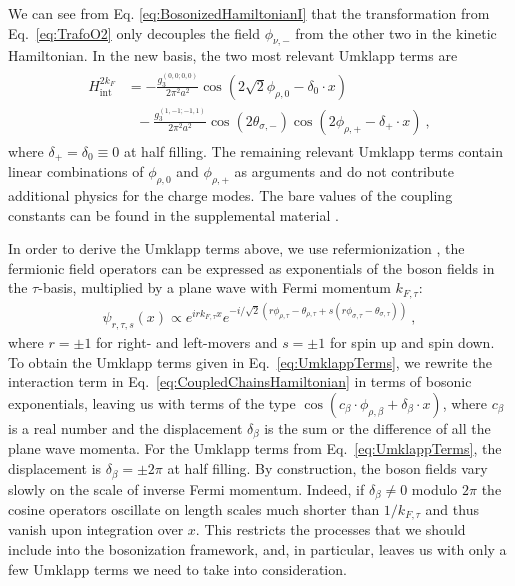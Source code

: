 \documentclass[twocolumn, prl, aps, floatfix, superscriptaddress, longbibliography]{revtex4-1}
\begin{document}
%
We can see from Eq. \eqref{eq:BosonizedHamiltonianI} that the transformation from Eq.~{\eqref{eq:TrafoO2}} only decouples the field $\phi_{\nu,-}$ from the other two in the kinetic Hamiltonian. In the new basis, the two  most relevant Umklapp terms are
%
\begin{align} \label{eq:UmklappTerms}
	\begin{split}
		H^{2k_F}_{\text{int}} &=  -\frac{g_3^{(0,0;0,0)}}{2\pi^2a^2} \cos(2\sqrt{2}\phi_{\rho,0} - \delta_0\cdot  x)   \\ 
		&\ \ \ -  \frac{g_3^{(1,-1;-1,1)}}{2\pi^2a^2}  \cos(2\theta_{\sigma,-}) \cos(2 \phi_{\rho,+} -\delta_+\cdot x) \ ,
	\end{split}
\end{align}
%
where $\delta_+ = \delta_0 \equiv 0$ at half filling. The remaining relevant Umklapp terms contain linear combinations of $\phi_{\rho,0}$ and $\phi_{\rho,+}$ as arguments and do not contribute additional physics for the charge modes. The bare values of the coupling constants can be found in the supplemental material \cite{supp}. 

In order to derive the Umklapp terms above, we use refermionization \cite{GiamarchiBook, vonDelft1998}, the fermionic field operators can be expressed  as exponentials of the boson fields in the $\tau$-basis, multiplied by a  plane wave with Fermi momentum $k_{F,\tau}$:
%
\begin{align}\label{eq:FieldOperator}
	\psi_{r,\tau,s}(x) \propto e^{irk_{F,\tau}x}e^{-i/\sqrt{2}(r\phi_{\rho,\tau} - \theta_{\rho,\tau}+s(r\phi_{\sigma,\tau}-\theta_{\sigma,\tau}))} \ ,
\end{align}
%
where $r=\pm1$ for right- and left-movers and $s = \pm1$ for spin up and spin down. To obtain the  Umklapp terms given in Eq.~\eqref{eq:UmklappTerms}, we rewrite the interaction term in Eq.~\eqref{eq:CoupledChainsHamiltonian} in terms of  bosonic exponentials, leaving us with terms of the type $\cos(c_{\beta}\cdot \phi_{\rho,\beta} + \delta_{\beta} \cdot x)$, where $c_{\beta}$ is a real number and the displacement $\delta_{\beta}$ is the sum or the difference of all the plane wave momenta. For the Umklapp terms from Eq.~\eqref{eq:UmklappTerms}, the displacement is $\delta_{\beta} = \pm 2\pi$ at half filling. By construction, the boson fields vary slowly on the scale of inverse Fermi momentum. Indeed, if $\delta_{\beta} \neq 0$ modulo $2\pi$ the cosine operators oscillate on length scales much shorter than $1/k_{F,\tau}$ and thus vanish upon integration over $x$. This restricts the processes that we should include into the bosonization framework, and, in particular, leaves us with only a few Umklapp terms we need to take into consideration. 
\end{document}

